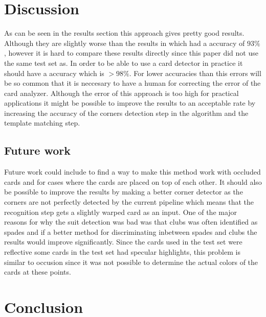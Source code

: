 \documentclass[journal,twoside]{IEEEtran}
\begin{document}

\section{Discussion}

As can be seen in the results section this approach gives pretty good results. Although they are slightly worse than the results in \cite{PokerVision} which had a accuracy of $93\%$, however it is hard to compare these results directly since this paper did not use the same test set as\cite{PokerVision}. In order to be able to use a card detector in practice it should have a accuracy which is $>98\%$. For lower accuracies than this errors will be so common that it is neccesary to have a human for correcting the error of the card analyzer.
Although the error of this approach is too high for practical applications it might be possible to improve the results to an acceptable rate by increasing the accuracy of the corners detection step in the algorithm and the template matching step.


\subsection{Future work}

Future work could include to find a way to make this method work with occluded cards and for cases where the cards are placed on top of each other. It should also be possible to improve the results by making a better corner detector as the corners are not perfectly detected by the current pipeline which means that the recognition step gets a slightly warped card as an input. One of the major reasons for why the suit detection was bad was that clubs was often identified as spades and if a better method for discriminating inbetween spades and clubs the results would improve significantly. Since the cards used in the test set were reflective some cards in the test set had specular highlights, this problem is similar to occusion since it was not possible to determine the actual colors of the cards at these points.



\section{Conclusion}
\end{document}
